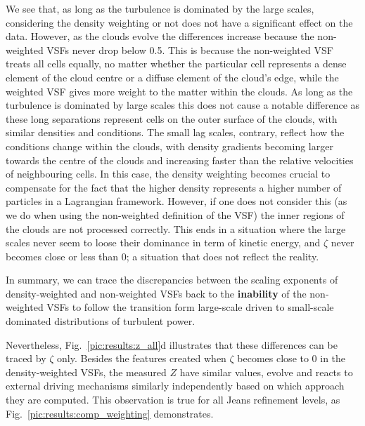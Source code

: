 We see that, as long as the turbulence is dominated by the large scales, considering the density weighting or not does not have a significant effect on the data. 
However, as the clouds evolve the differences increase because the non-weighted VSFs never drop below 0.5.
This is because the non-weighted VSF treats all cells equally, no matter whether the particular cell represents a dense element of the cloud centre or a diffuse element of the cloud's edge, while the weighted VSF gives more weight to the matter within the clouds.
As long as the turbulence is dominated by large scales this does not cause a notable difference as these long separations represent cells on the outer surface of the clouds, with similar densities and conditions.
The small lag scales, contrary, reflect how the conditions change within the clouds, with density gradients becoming larger towards the centre of the clouds and increasing faster than the relative velocities of neighbouring cells.
In this case, the density weighting becomes crucial to compensate for the fact that the higher density represents a higher number of particles in a Lagrangian framework.
However, if one does not consider this (as we do when using the non-weighted definition of the VSF) the inner regions of the clouds are not processed correctly.
This ends in a situation where the large scales never seem to loose their dominance in term of kinetic energy, and $\zeta$ never becomes close or less than 0; a situation that does not reflect the reality.

In summary, we can trace the discrepancies between the scaling exponents of density-weighted and non-weighted VSFs back to the \textbf{inability} of the non-weighted VSFs to follow the transition form large-scale driven to small-scale dominated distributions of turbulent power.


Nevertheless, Fig.~\ref{pic:results:z_all}d illustrates that these differences can be traced by $\zeta$ only. 
Besides the features created when $\zeta$ becomes close to 0 in the density-weighted VSFs, the measured $Z$ have similar values, evolve and reacts to external driving mechanisms similarly independently based on which approach they are computed. 
This observation is true for all Jeans refinement levels, as Fig.~\ref{pic:results:comp_weighting} demonstrates.

